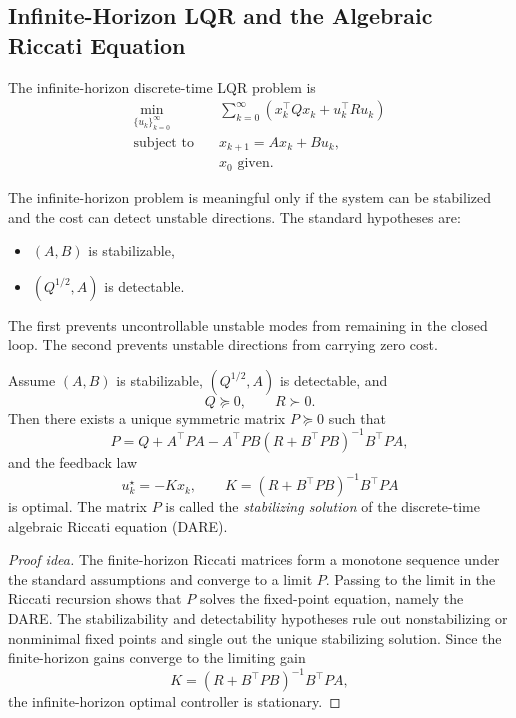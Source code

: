 \subsection{Infinite-Horizon LQR and the Algebraic Riccati Equation}
\label{sec:l6-infinite-horizon-lqr-and-the-algebraic-riccati-equation}

\begin{definition}\label{def:l6-infinite-horizon-discrete-time-lqr}
	The infinite-horizon discrete-time LQR problem is
	\begin{align*}
		\min_{\{u_k\}_{k=0}^{\infty}} \quad & \sum_{k=0}^{\infty}\left(x_k^\top Q x_k + u_k^\top R u_k\right) \\
		\text{subject to}\quad & x_{k+1}=Ax_k+Bu_k, \\
		                       & x_0 \text{ given}.
	\end{align*}
\end{definition}

\begin{remark}
	The infinite-horizon problem is meaningful only if the system can be stabilized and the cost can detect unstable directions. The standard hypotheses are:
	\begin{itemize}
		\item $(A,B)$ is stabilizable,
		\item $(Q^{1/2},A)$ is detectable.
	\end{itemize}
	The first prevents uncontrollable unstable modes from remaining in the closed loop. The second prevents unstable directions from carrying zero cost.
\end{remark}

\begin{theorem}\label{thm:l6-discrete-time-algebraic-riccati-equation-and-optimal-gain}
	Assume $(A,B)$ is stabilizable, $(Q^{1/2},A)$ is detectable, and
	\[
		Q \succeq 0,
		\qquad
		R \succ 0.
	\]
	Then there exists a unique symmetric matrix $P \succeq 0$ such that
	\[
		P = Q + A^\top P A - A^\top P B\left(R+B^\top P B\right)^{-1}B^\top P A,
	\]
	and the feedback law
	\[
		u_k^\star = -Kx_k,
		\qquad
		K = \left(R+B^\top P B\right)^{-1}B^\top P A
	\]
	is optimal. The matrix $P$ is called the \emph{stabilizing solution} of the discrete-time algebraic Riccati equation (DARE).
\end{theorem}

\begin{proof}[Proof idea]
	The finite-horizon Riccati matrices form a monotone sequence under the standard assumptions and converge to a limit $P$. Passing to the limit in the Riccati recursion shows that $P$ solves the fixed-point equation, namely the DARE. The stabilizability and detectability hypotheses rule out nonstabilizing or nonminimal fixed points and single out the unique stabilizing solution. Since the finite-horizon gains converge to the limiting gain
	\[
		K = \left(R+B^\top P B\right)^{-1}B^\top P A,
	\]
	the infinite-horizon optimal controller is stationary.
\end{proof}

